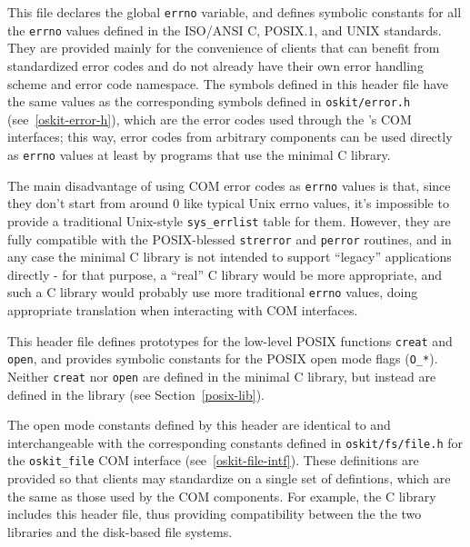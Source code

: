 \label{errno-h}
\begin{apidesc}
	This file declares the global {\tt errno} variable,
	and defines symbolic constants for all the {\tt errno} values
	defined in the ISO/ANSI C, POSIX.1, and UNIX standards.
	They are provided mainly for the convenience
	of clients that can benefit from standardized error codes
	and do not already have their own error handling scheme
	and error code namespace.
	The symbols defined in this header file
	have the same values as the corresponding symbols
	defined in \texttt{oskit/error.h}
	(see~\ref{oskit-error-h}),
	which are the error codes used through the \oskit's COM interfaces;
	this way, error codes from arbitrary \oskit{} components
	can be used directly as \texttt{errno} values
	at least by programs that use the minimal C library.

	The main disadvantage of using COM error codes as \texttt{errno} values
	is that,
	since they don't start from around 0 like typical Unix errno values,
	it's impossible to provide
	a traditional Unix-style \texttt{sys_errlist} table for them.
	However, they are fully compatible
	with the POSIX-blessed \texttt{strerror} and \texttt{perror} routines,
	and in any case the minimal C library
	is not intended to support ``legacy'' applications directly -
	for that purpose, a ``real'' C library would be more appropriate,
	and such a C library would probably use
	more traditional \texttt{errno} values,
	doing appropriate translation when interacting with COM interfaces.
\end{apidesc}

\label{fcntl-h}
\label{open}
\begin{apidesc}
	This header file defines prototypes
	for the low-level POSIX functions {\tt creat} and {\tt open},
	and provides symbolic constants
	for the POSIX open mode flags ({\tt O_*}). Neither {\tt creat} nor
	{\tt open} are defined in the minimal C library, but instead are
	defined in the \posix{} library (see Section~\ref{posix-lib}).

	The open mode constants defined by this header
	are identical to and interchangeable with
	the corresponding constants
	defined in \texttt{oskit/fs/file.h}
	for the \texttt{oskit_file} COM interface
	(see~\ref{oskit-file-intf}).
	These definitions are provided so that clients may standardize on a
	single set of defintions, which are the same as those used by
	the COM components. For example, the \freebsd{} C library
	includes this header file, thus providing compatibility between the
	the two libraries and the disk-based file systems.
\end{apidesc}

